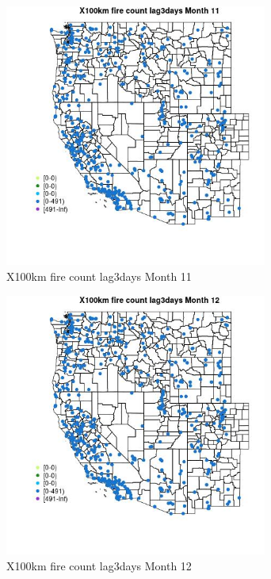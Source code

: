 \begin{figure} 
\centering  
\includegraphics[width=0.77\textwidth]{Code_Outputs/Report_ML_input_PM25_Step4_part_e_de_duplicated_aves_compiled_2019-05-14wNAs_MapObsMo11X100km_fire_count_lag3days.jpg} 
\caption{\label{fig:Report_ML_input_PM25_Step4_part_e_de_duplicated_aves_compiled_2019-05-14wNAsMapObsMo11X100km_fire_count_lag3days}X100km fire count lag3days Month 11} 
\end{figure} 
 

\begin{figure} 
\centering  
\includegraphics[width=0.77\textwidth]{Code_Outputs/Report_ML_input_PM25_Step4_part_e_de_duplicated_aves_compiled_2019-05-14wNAs_MapObsMo12X100km_fire_count_lag3days.jpg} 
\caption{\label{fig:Report_ML_input_PM25_Step4_part_e_de_duplicated_aves_compiled_2019-05-14wNAsMapObsMo12X100km_fire_count_lag3days}X100km fire count lag3days Month 12} 
\end{figure} 
 

